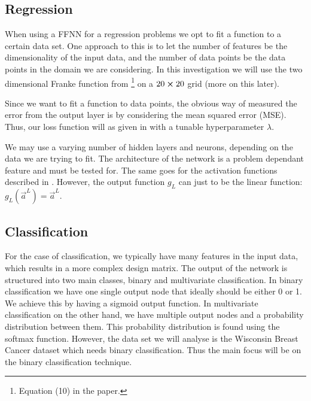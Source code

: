 \subsection{Regression}\label{sec:regression}
    When using a FFNN for a regression problems we opt to fit a function to a certain data set. One approach to this is to let the number of features be the dimensionality of the input data, and the number of data points be the data points in the domain we are considering. In this investigation we will use the two dimensional Franke function from \projectOne\footnote{Equation (10) in the paper.} on a $20\cross 20$ grid (more on this later).
    
    Since we want to fit a function to data points, the obvious way of measured the error from the output layer is by considering the mean squared error (MSE). Thus, our loss function will as given in  with a tunable hyperparameter $\lambda$. 

    We may use a varying number of hidden layers and neurons, depending on the data we are trying to fit. The architecture of the network is a problem dependant feature and must be tested for. The same goes for the activation functions described in . However, the output function $g_L$ can just to be the linear function: $g_L(\vec{a}^L) = \vec{a}^{L}$. 
    
    

\subsection{Classification}\label{sec:classification}
    For the case of classification, we typically have many features in the input data, which results in a more complex design matrix. The output of the network is structured into two main classes, binary and multivariate classification. In binary classification we have one single output node that ideally should be either 0 or 1. We achieve this by having a sigmoid output function. In multivariate classification on the other hand, we have multiple output nodes and a probability distribution between them. This probability distribution is found using the softmax function. However, the data set we will analyse is the Wisconsin Breast Cancer dataset \citep{scikit-learn} which needs binary classification. Thus the main focus will be on the binary classification technique. 

